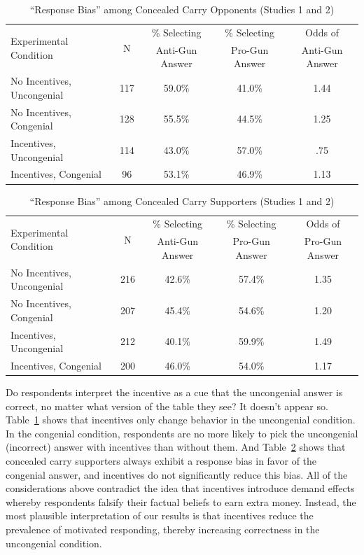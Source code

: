 \documentclass[12pt, letterpaper]{article}
\begin{document}
\singlespacing
\begin{table}[h]
\centering
\caption {``Response Bias'' among Concealed Carry Opponents (Studies 1 and 2)}
\label{tab:demand_opp}
\begin{tabular}{| l | c | c | c | c |}
\hline 
\multirow{2}{*}{Experimental Condition} & \multirow{2}{*}{N} & \% Selecting & \% Selecting & Odds of \\ 
					& 		& Anti-Gun Answer & Pro-Gun Answer  & Anti-Gun Answer \\ \hline
No Incentives, Uncongenial	& 117	& 59.0\% & 41.0\% & 1.44 \\ 
No Incentives, Congenial	& 128	& 55.5\% & 44.5\% & 1.25 \\ 
Incentives, Uncongenial	& 114	& 43.0\% & 57.0\% & .75 \\ 
Incentives, Congenial		& 96		& 53.1\% & 46.9\% & 1.13 \\ \hline
\end{tabular}
\end{table}
\doublespacing

\singlespacing
\begin{table}[h]
\centering
\caption {``Response Bias'' among Concealed Carry Supporters (Studies 1 and 2)}
\label{tab:demand_supp}
\begin{tabular}{| l | c | c | c | c |}
\hline 
\multirow{2}{*}{Experimental Condition} & \multirow{2}{*}{N} & \% Selecting & \% Selecting & Odds of \\ 
					& 		& Anti-Gun Answer & Pro-Gun Answer  & Pro-Gun Answer \\ \hline
No Incentives, Uncongenial	& 216	& 42.6\%		& 57.4\%			& 1.35 \\ 
No Incentives, Congenial	& 207	& 45.4\%		& 54.6\%			& 1.20 \\ 
Incentives, Uncongenial	& 212	& 40.1\%		& 59.9\%			& 1.49 \\ 
Incentives, Congenial		& 200	& 46.0\%		& 54.0\%			& 1.17 \\ \hline
\end{tabular}
\end{table}
\doublespacing

Do respondents interpret the incentive as a cue that the uncongenial answer is correct, no matter what version of the table they see? It doesn't appear so. Table~\ref{tab:demand_opp} shows that incentives only change behavior in the uncongenial condition. In the congenial condition, respondents are no more likely to pick the uncongenial (incorrect) answer with incentives than without them.
And Table~\ref{tab:demand_supp} shows that concealed carry supporters always exhibit a response bias in favor of the congenial answer, and incentives do not significantly reduce this bias.
All of the considerations above contradict the idea that incentives introduce demand effects whereby respondents falsify their factual beliefs to earn extra money. Instead, the most plausible interpretation of our results is that incentives reduce the prevalence of motivated responding, thereby increasing correctness in the uncongenial condition.
\end{document}
